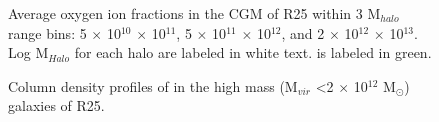 \documentclass[]{emulateapj}
\begin{document}
\vspace{-7mm}
\begin{figure}[ht!]
\centerline{}
\caption[]{Average oxygen ion fractions in the CGM of R25 within 3 M$_{halo}$ range bins: 5 $\times$ 10$^{10}$  $\times$ 10$^{11}$, 5 $\times$ 10$^{11}$  $\times$ 10$^{12}$, and 2 $\times$ 10$^{12}$  $\times$ 10$^{13}$. Log M$_{Halo}$ for each halo are labeled in white text.  is labeled in green.}
\label{fig-oppenheimer}
\end{figure}

\begin{figure}[ht!]
\centerline{}
\caption[]{Column density profiles of  in the high mass (M$_{vir}$ \textless 2 $\times$ 10$^{12}$ M$_{\odot}$) galaxies of R25.}
\label{fig-highmass_Novi}
\end{figure}
\end{document}
